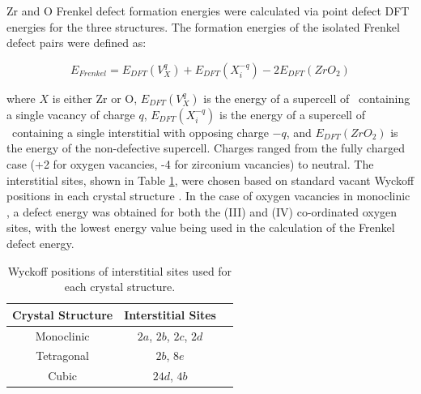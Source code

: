 Zr and O Frenkel defect formation energies were calculated via point defect DFT energies for the three structures. The formation energies of the isolated Frenkel defect pairs were defined as:

\begin{equation}
\label{equation_frenkel}
E_{Frenkel} = E_{DFT}(V^{q}_{X}) + E_{DFT}(X^{-q}_{i}) - 2E_{DFT}(ZrO_2)%
\end{equation}

where $X$ is either Zr or O, $E_{DFT}(V^{q}_{X})$ is the energy of a supercell of \zirconia\ containing a single vacancy of charge $q$, $E_{DFT}(X^{-q}_{i})$ is the energy of a supercell of \zirconia\ containing a single interstitial with opposing charge $-q$, and $E_{DFT}(ZrO_2)$ is the energy of the non-defective supercell. Charges ranged from the fully charged case (+2 for oxygen vacancies, -4 for zirconium vacancies) to neutral. The interstitial sites, shown in Table \ref{table:interstitials}, were chosen based on standard vacant Wyckoff positions in each crystal structure \cite{theo1996international}.  In the case of oxygen vacancies in monoclinic \zirconia , a defect energy was obtained for both the (III) and (IV) co-ordinated oxygen sites, with the lowest energy value being used in the calculation of the Frenkel defect energy.

\begin{table}[htp] %
\onehalfspacing
\centering
\caption{Wyckoff positions of interstitial sites used for each crystal structure.}
\label{table:interstitials}
\begin{tabular}{lcc}
\hline
\hspace{0.7 cm} {\bf Crystal Structure} \hspace{0.7 cm}                              & \hspace{0.7 cm} {\bf Interstitial Sites} \hspace{0.7 cm}                                               \\ \hline
\multicolumn{1}{c}{Monoclinic}              & $2a$, $2b$, $2c$, $2d$ \\
\multicolumn{1}{c}{Tetragonal}            & $2b$, $8e$                                   \\
\multicolumn{1}{c}{Cubic}       & $24d$, $4b$                                          \\ \hline
\end{tabular}
\end{table}

